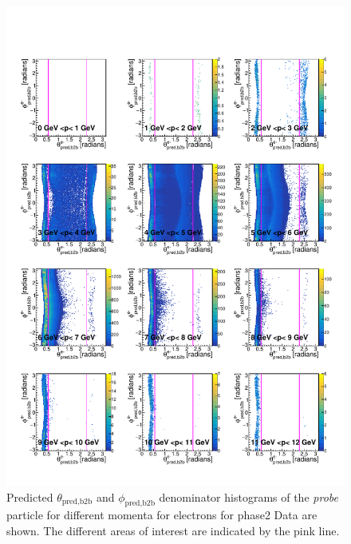 \documentclass[a4paper,11pt,twosided,final,german,openbib,pdftex,listof=totoc,bibliography=totoc]{scrbook}
\begin{document}
\begin{appendix}
\newpage



\clearpage










\begin{figure}[h!]
	\includegraphics[width=\textwidth]{Plots/master/RTPMemD_Data.pdf}
	\caption[Denominator $\theta_{\textrm{pred,b2b}}$-$\phi_{\textrm{pred,b2b}}$ Electron Momentum Phase2 Data]{Predicted $\theta_{\textrm{pred,b2b}}$ and $\phi_{\textrm{pred,b2b}}$ denominator histograms of the \textit{probe} particle for different momenta for electrons for phase2 Data are shown. The different areas of interest are indicated by the pink line.}
	\label{plt:RTPMemD_Data}
\end{figure}




\end{appendix}
\end{document}

